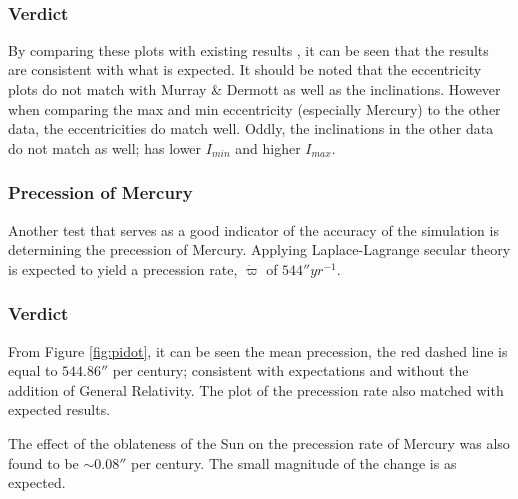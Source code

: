 \documentclass[11pt, oneside]{article}   	%
\begin{document}
\newpage
\ 
\newpage
\
\newpage

\subsubsection*{Verdict}

By comparing these plots with existing results \cite{ssd, texas}, it can be seen that the results are consistent with what is expected. It should be noted that the eccentricity plots do not match with Murray \& Dermott as well as the inclinations. However when comparing the max and min eccentricity (especially Mercury) to the other data\cite{texas}, the eccentricities do match well. Oddly, the inclinations in the other data\cite{texas} do not match as well; has lower $I_{min}$ and higher $I_{max}$.

\subsubsection{Precession of Mercury}

Another test that serves as a good indicator of the accuracy of the simulation is determining the precession of Mercury. Applying Laplace-Lagrange secular theory is expected to yield a precession rate, $\dot{\varpi}$ of $544{}'' yr^{-1}$\cite{texas, PRMer}.

\subsubsection*{Verdict}

From Figure \ref{fig:pidot}, it can be seen the mean precession, the red dashed line is equal to $544.86{}''$ per century; consistent with expectations and without the addition of General Relativity. The plot of the precession rate also matched with expected results\cite{texas}.

The effect of the oblateness of the Sun on the precession rate of Mercury was also found to be $\sim 0.08{}''$ per century. The small magnitude of the change is as expected.
        
\end{document}
